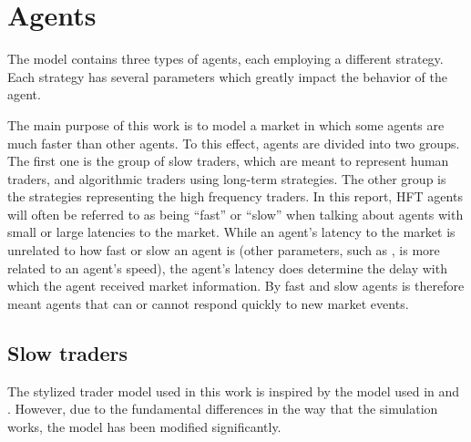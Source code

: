 \section{Agents}\label{section:agents}
The model contains three types of agents, each employing a different strategy. Each strategy has several parameters which greatly impact the behavior of the agent.

The main purpose of this work is to model a market in which some agents are much faster than other agents. To this effect, agents are divided into two groups. The first one is the group of slow traders, which are meant to represent human traders, and algorithmic traders using long-term strategies. The other group is the strategies representing the high frequency traders. In this report, HFT agents will often be referred to as being ``fast'' or ``slow'' when talking about agents with small or large latencies to the market. While an agent's latency to the market is unrelated to how fast or slow an agent is (other parameters, such as ,  is more related to an agent's speed), the agent's latency does determine the delay with which the agent received market information. By fast and slow agents is therefore meant agents that can or cannot respond quickly to new market events.


\subsection{Slow traders}\label{section:slow_traders}
The stylized trader model used in this work is inspired by the model used in \cite{chiWang} and \cite{theImpactOfHeterogenous}. However, due to the fundamental differences in the way that the simulation works, the model has been modified significantly. 

